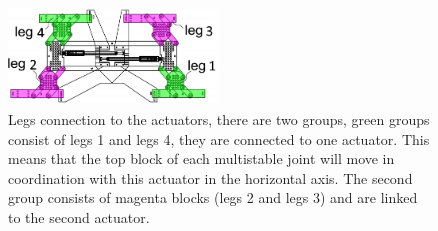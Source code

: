         \begin{figure}
            \centering
            \includegraphics[width=0.5\textwidth]{images/legs_connection.png}
            \caption{Legs connection to the actuators, there are two groups, green groups consist of legs 1 and legs 4, they are connected to one actuator. This means that the top block of each multistable joint will move in coordination with this actuator in the horizontal axis. The second group consists of magenta blocks (legs 2 and legs 3) and are linked to the second actuator.}
            \label{fig:legs_connection}
        \end{figure}
